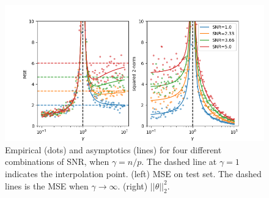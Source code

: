 \documentclass{amsart}
\numberwithin{equation}{section}
\numberwithin{table}{section}
\numberwithin{figure}{section}
\theoremstyle{plain}
\theoremstyle{definition}
\theoremstyle{remark}
\begin{document}
\begin{figure}[h]
  \centering
  \includegraphics[width=1\linewidth, angle=0]{Figure_1} %
  \caption{Empirical (dots) and asymptotics (lines) for four different
    combinations of SNR, when $\gamma=n/p$. The dashed line at
    $\gamma=1$ indicates the interpolation point. (left) MSE on test
    set. The dashed lines is the MSE when $\gamma \rightarrow
    \infty$. (right) $||\theta||_2^2$.}
  \label{fig:double}
\end{figure}



\end{document}
